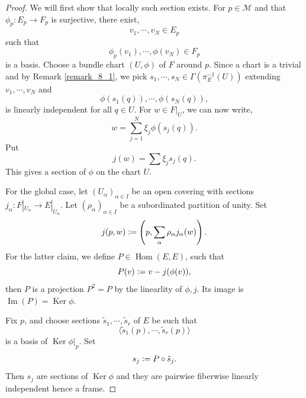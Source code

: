 \documentclass[8pt]{article}
\DeclareMathOperator{\Hom}{Hom}
\DeclareMathOperator{\Ker}{Ker}
\DeclareMathOperator{\Image}{Im}
\newcommand{\defeq}{\vcentcolon=}
\newcommand{\M}[0]{\mathcal{M}}
\begin{document}
\begin{proof}
  We will first show that locally such section exists. For $p\in\M$ and that $\phi_p:E_p\to F_p$ is surjective, there exist,
  \begin{equation*}
    v_1,\cdots,v_N\in E_p
  \end{equation*}
  such that 
  \begin{equation*}
    \phi_p(v_1),\cdots,\phi(v_N)\in F_p
  \end{equation*}
  is a basis. Choose a bundle chart $(U,\phi)$ of $F$ around $p$. Since a chart is a trivial and by Remark \ref{remark_8_1}, we pick $s_1,\cdots,s_N\in\Gamma(\pi^{-1}_E(U))$ extending $v_1,\cdots,v_N$ and
  \begin{equation*}
    \phi(s_1(q)),\cdots,\phi(s_N(q)),
  \end{equation*}
  is linearly independent for all $q\in U$. For $w\in F|_U$, we can now write,
  \begin{equation*}
    w = \sum_{j=1}^N\xi_j\phi(s_j(q)).
  \end{equation*}
  Put 
  \begin{equation*}
    j(w) = \sum\xi_js_j(q).
  \end{equation*}
  This gives a section of $\phi$ on the chart $U$.
  \par For the global case, let $(U_\alpha)_{\alpha\in I}$ be an open covering with sections $j_\alpha:F|_{U_\alpha}\to E|_{U_\alpha}$. Let $(\rho_\alpha)_{\alpha\in I}$ be a subordinated partition of unity. Set
  \begin{equation*}
    j(p,w) \defeq \left(p,\sum_{\alpha} \rho_{\alpha}j_{\alpha}(w)\right).
  \end{equation*}
  For the latter claim, we define $P\in\Hom(E,E)$, such that
  \begin{equation*}
    P(v) \defeq v-j(\phi(v)),
  \end{equation*}
  then $P$ is a projection $P^2=P$ by the linearlity of $\phi,j$. Its image is $\Image(P) = \Ker \phi$.
  \par Fix $p$, and choose sections $\tilde{s}_1,\cdots,\tilde{s}_r$ of $E$ be such that 
  \begin{equation*}
    \langle \tilde{s}_1(p),\cdots,\tilde{s}_r(p)\rangle
  \end{equation*}
  is a basis of $\Ker\phi|_p$. Set 
  \begin{equation*}
    s_j\defeq P\circ\tilde{s}_j.
  \end{equation*}
  Then $s_j$ are sections of $\Ker\phi$ and they are pairwise fiberwise linearly independent hence a frame.
\end{proof}
\end{document}
